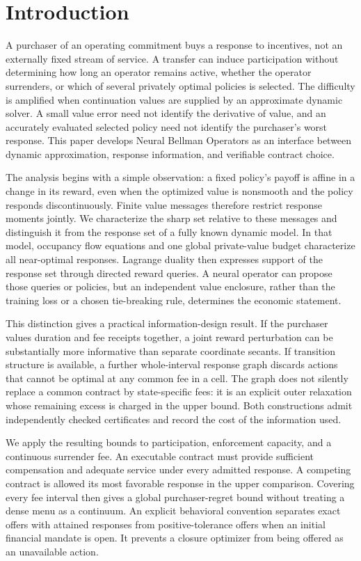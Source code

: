 \section{Introduction}
A purchaser of an operating commitment buys a response to incentives, not an externally fixed stream of service. A transfer can induce participation without determining how long an operator remains active, whether the operator surrenders, or which of several privately optimal policies is selected. The difficulty is amplified when continuation values are supplied by an approximate dynamic solver. A small value error need not identify the derivative of value, and an accurately evaluated selected policy need not identify the purchaser's worst response. This paper develops Neural Bellman Operators as an interface between dynamic approximation, response information, and verifiable contract choice.

The analysis begins with a simple observation: a fixed policy's payoff is affine in a change in its reward, even when the optimized value is nonsmooth and the policy responds discontinuously. Finite value messages therefore restrict response moments jointly. We characterize the sharp set relative to these messages and distinguish it from the response set of a fully known dynamic model. In that model, occupancy flow equations and one global private-value budget characterize all near-optimal responses. Lagrange duality then expresses support of the response set through directed reward queries. A neural operator can propose those queries or policies, but an independent value enclosure, rather than the training loss or a chosen tie-breaking rule, determines the economic statement.

This distinction gives a practical information-design result. If the purchaser values duration and fee receipts together, a joint reward perturbation can be substantially more informative than separate coordinate secants. If transition structure is available, a further whole-interval response graph discards actions that cannot be optimal at any common fee in a cell. The graph does not silently replace a common contract by state-specific fees: it is an explicit outer relaxation whose remaining excess is charged in the upper bound. Both constructions admit independently checked certificates and record the cost of the information used.

We apply the resulting bounds to participation, enforcement capacity, and a continuous surrender fee. An executable contract must provide sufficient compensation and adequate service under every admitted response. A competing contract is allowed its most favorable response in the upper comparison. Covering every fee interval then gives a global purchaser-regret bound without treating a dense menu as a continuum. An explicit behavioral convention separates exact offers with attained responses from positive-tolerance offers when an initial financial mandate is open. It prevents a closure optimizer from being offered as an unavailable action.

